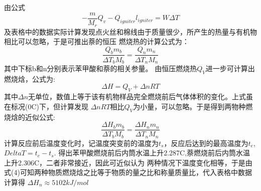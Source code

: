 ﻿\documentclass[10.5pt]{ctexart}
\begin{document}
\begin{figure}[!ht]
  \centering
\end{figure}

\subsection{\textbf{}}


由公式
\begin{equation}
-\frac{m}{M_r}Q_v-Q_{igniter}l_{igniter}=W\Delta T
\end{equation}
及表格中的数据实际计算发现点火丝和棉线由于质量很少，所产生的热量与有机物相比可以忽略，于是可推出萘的恒压
燃烧热的计算公式为：
\begin{equation}
\frac{Q_b m_b}{\Delta T_b M_b}=\frac{Q_n m_n}{\Delta T_n M_n}
\end{equation}
其中下标b和n分别表示苯甲酸和萘的相关参量。
由恒压燃烧热$Q_V$进一步可计算出燃烧焓，公式为:
\begin{equation}
\Delta H=Q_V+\Delta n R T
\end{equation}
其中$\Delta n$无单位，数值上等于该有机物样品完全燃烧前后气体体积的变化。上式虽在标况(0\degree C)下，但计算发现 $\Delta n RT$相比$Q_V$为小量，可以忽略。于是得到两物种燃烧焓的近似公式:
\begin{equation}
\frac{{\Delta H}_b m_b}{\Delta T_b M_b}=\frac{{\Delta H}_n m_n}{\Delta T_n M_n}
\end{equation}
计算反应前后温度变化时，记温度突变前的温度为$t_s$，反应后达到的最高温度为$t_e$,$Delta T=t_e-t_s$.
得出苯甲酸燃烧前后内筒水温上升2.287\degree C,萘燃烧前后内筒水温上升2.306\degree C，二者非常接近，因此可近似认为
两种情况下温度变化相等，于是由式(4)可知两种物质燃烧焓之比等于物质的量之比和称量质量比，代入表格中数据计算得
${\Delta H}_n \approx 5102 kJ/mol $
\end{document}
